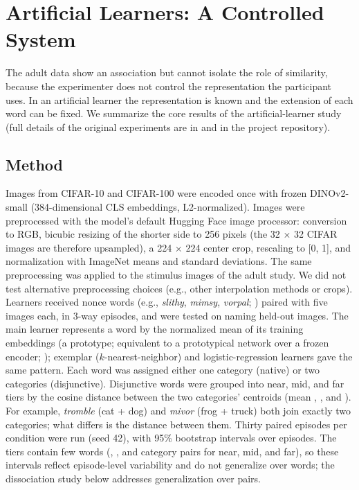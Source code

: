\documentclass[11pt]{article}
\begin{document}
\section{Artificial Learners: A Controlled System}
\label{sec:learners}


The adult data show an association but cannot isolate the role of similarity, because the experimenter does not control the representation the participant uses. In an artificial learner the representation is known and the extension of each word can be fixed. We summarize the core results of the artificial-learner study (full details of the original experiments are in \textcite{vera2026lexical} and in the project repository).

\subsection{Method}

Images from CIFAR-10 and CIFAR-100 \parencite{krizhevsky2009} were encoded once with frozen DINOv2-small \parencite{oquab2023} (384-dimensional CLS embeddings, L2-normalized). Images were preprocessed with the model's default Hugging Face image processor: conversion to RGB, bicubic resizing of the shorter side to 256 pixels (the 32 $\times$ 32 CIFAR images are therefore upsampled), a 224 $\times$ 224 center crop, rescaling to [0, 1], and normalization with ImageNet means and standard deviations. The same preprocessing was applied to the stimulus images of the adult study. We did not test alternative preprocessing choices (e.g., other interpolation methods or crops). Learners received nonce words (e.g., \emph{slithy}, \emph{mimsy}, \emph{vorpal}; \cite{carroll1871}) paired with five images each, in 3-way episodes, and were tested on naming held-out images. The main learner represents a word by the normalized mean of its training embeddings (a prototype; equivalent to a prototypical network over a frozen encoder; \cite{snell2017}); exemplar ($k$-nearest-neighbor) and logistic-regression learners gave the same pattern. Each word was assigned either one category (native) or two categories (disjunctive). Disjunctive words were grouped into near, mid, and far tiers by the cosine distance between the two categories' centroids (mean \DmemNear, \DmemMid, and \DmemFar). For example, \emph{tromble} (cat + dog) and \emph{mivor} (frog + truck) both join exactly two categories; what differs is the distance between them. Thirty paired episodes per condition were run (seed 42), with 95\% bootstrap intervals over episodes. The tiers contain few words (\NPairsNear, \NPairsMid, and \NPairsFar{} category pairs for near, mid, and far), so these intervals reflect episode-level variability and do not generalize over words; the dissociation study below addresses generalization over pairs.
\end{document}

